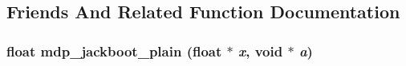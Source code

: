 \subsection{Friends And Related Function Documentation}
\hypertarget{classmdp__jackboot_ad5b6e252253804e3e371008fbad7b43a}{
\subsubsection[{mdp\_\-jackboot\_\-plain}]{\setlength{\rightskip}{0pt plus 5cm}float mdp\_\-jackboot\_\-plain (float $\ast$ {\em x}, \/  void $\ast$ {\em a})}}
\label{classmdp__jackboot_ad5b6e252253804e3e371008fbad7b43a}



